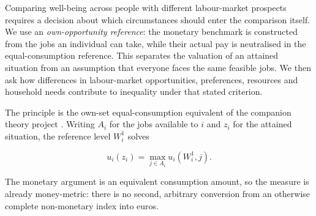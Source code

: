\documentclass[11pt,a4paper]{article}
\begin{document}
Comparing well-being across people with different labour-market prospects requires a decision about which circumstances should enter the comparison itself. We use an \emph{own-opportunity reference}: the monetary benchmark is constructed from the jobs an individual can take, while their actual pay is neutralised in the equal-consumption reference. This separates the valuation of an attained situation from an assumption that everyone faces the same feasible jobs. We then ask how differences in labour-market opportunities, preferences, resources and household needs contribute to inequality under that stated criterion.

The principle is the own-set equal-consumption equivalent of the companion theory project \citep{haydarmaniquet}. Writing \(A_i\) for the jobs available to \(i\) and \(z_i\) for the attained situation, the reference level \(W^1_i\) solves

\[u_i(z_i)=\max_{j\in A_i} u_i(W^1_i,j).\]

The monetary argument is an equivalent consumption amount, so the measure is already money-metric: there is no second, arbitrary conversion from an otherwise complete non-monetary index into euros.
\end{document}

